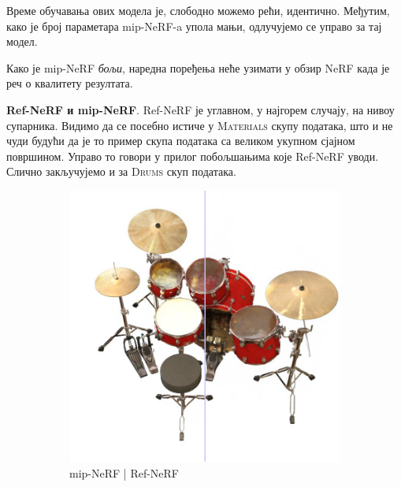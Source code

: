 \documentclass[12pt, a4paper, twoside]{book}
\numberwithin{equation}{chapter}
\numberwithin{theorem}{section}
\numberwithin{definition}{section}
\numberwithin{definitionChapter}{chapter}
\begin{document}
Време обучавања ових модела је, слободно можемо рећи, идентично. Међутим, како је број параметара mip-NeRF-a упола мањи,
одлучујемо се управо за тај модел.

Како је mip-NeRF \textit{бољи}, наредна поређења неће узимати у обзир NeRF када је реч о квалитету резултата.

\textbf{Ref-NeRF и mip-NeRF}. Ref-NeRF је углавном, у најгорем случају, на нивоу супарника. Видимо да се посебно истиче у
\textsc{Materials} скупу података, што и не чуди будући да је то пример скупа података са великом укупном сјајном површином.
Управо то говори у прилог побољшањима које Ref-NeRF уводи. Слично закључујемо и за \textsc{Drums} скуп података.

	\begin{figure}[H]
		\centering
		\begin{subfigure}{0.475\textwidth}
			\centering
			\includegraphics[scale=0.25]{img/comparison/mipnerf_vs_refnerf_drums_3.png}
			\caption{mip-NeRF | Ref-NeRF}
		\end{subfigure}
		\begin{subfigure}{0.475\textwidth}
			\centering

\end{subfigure}
\end{figure}
\end{document}
